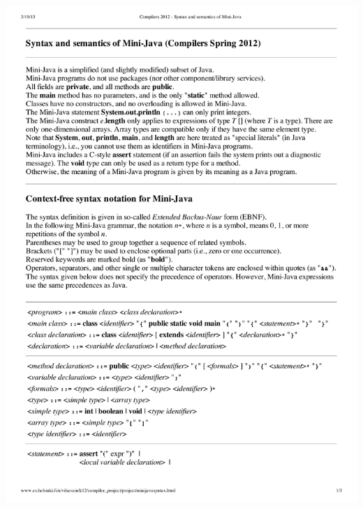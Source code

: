 \documentclass[a4paper,11pt]{article}
\begin{document}
\includegraphics[width=1.0\textwidth,page=1]{spec.pdf}
\end{document}
